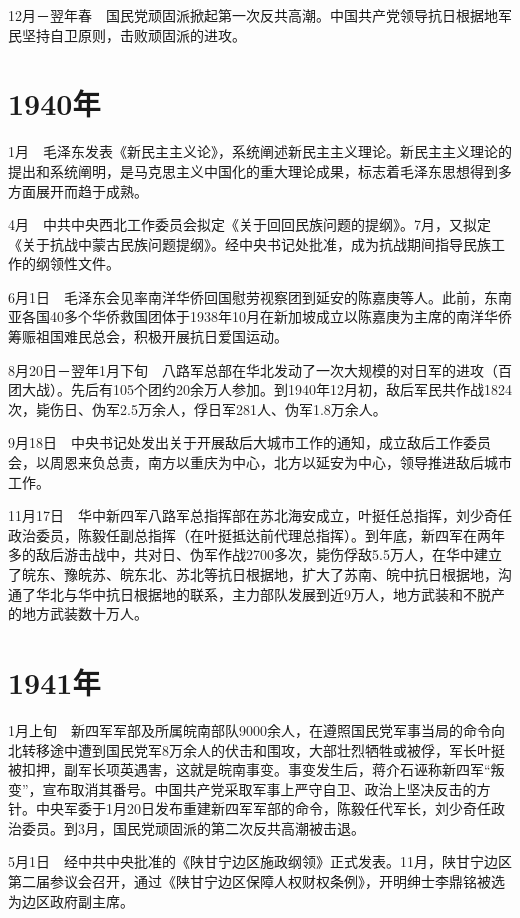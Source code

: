 \documentclass[10pt,a4paper,twocolumn]{book}
\begin{document}
12月－翌年春　国民党顽固派掀起第一次反共高潮。中国共产党领导抗日根据地军民坚持自卫原则，击败顽固派的进攻。

\section{1940年}

1月　毛泽东发表《新民主主义论》，系统阐述新民主主义理论。新民主主义理论的提出和系统阐明，是马克思主义中国化的重大理论成果，标志着毛泽东思想得到多方面展开而趋于成熟。

4月　中共中央西北工作委员会拟定《关于回回民族问题的提纲》。7月，又拟定《关于抗战中蒙古民族问题提纲》。经中央书记处批准，成为抗战期间指导民族工作的纲领性文件。

6月1日　毛泽东会见率南洋华侨回国慰劳视察团到延安的陈嘉庚等人。此前，东南亚各国40多个华侨救国团体于1938年10月在新加坡成立以陈嘉庚为主席的南洋华侨筹赈祖国难民总会，积极开展抗日爱国运动。

8月20日－翌年1月下旬　八路军总部在华北发动了一次大规模的对日军的进攻（百团大战）。先后有105个团约20余万人参加。到1940年12月初，敌后军民共作战1824次，毙伤日、伪军2.5万余人，俘日军281人、伪军1.8万余人。

9月18日　中央书记处发出关于开展敌后大城市工作的通知，成立敌后工作委员会，以周恩来负总责，南方以重庆为中心，北方以延安为中心，领导推进敌后城市工作。

11月17日　华中新四军八路军总指挥部在苏北海安成立，叶挺任总指挥，刘少奇任政治委员，陈毅任副总指挥（在叶挺抵达前代理总指挥）。到年底，新四军在两年多的敌后游击战中，共对日、伪军作战2700多次，毙伤俘敌5.5万人，在华中建立了皖东、豫皖苏、皖东北、苏北等抗日根据地，扩大了苏南、皖中抗日根据地，沟通了华北与华中抗日根据地的联系，主力部队发展到近9万人，地方武装和不脱产的地方武装数十万人。

\section{1941年}

1月上旬　新四军军部及所属皖南部队9000余人，在遵照国民党军事当局的命令向北转移途中遭到国民党军8万余人的伏击和围攻，大部壮烈牺牲或被俘，军长叶挺被扣押，副军长项英遇害，这就是皖南事变。事变发生后，蒋介石诬称新四军“叛变”，宣布取消其番号。中国共产党采取军事上严守自卫、政治上坚决反击的方针。中央军委于1月20日发布重建新四军军部的命令，陈毅任代军长，刘少奇任政治委员。到3月，国民党顽固派的第二次反共高潮被击退。

5月1日　经中共中央批准的《陕甘宁边区施政纲领》正式发表。11月，陕甘宁边区第二届参议会召开，通过《陕甘宁边区保障人权财权条例》，开明绅士李鼎铭被选为边区政府副主席。
\end{document}
